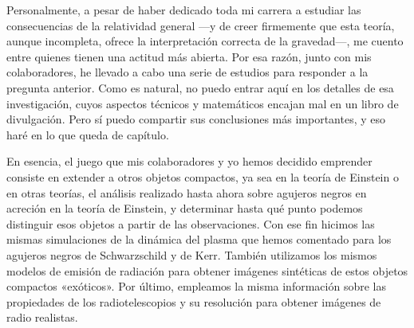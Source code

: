 Personalmente, a pesar de haber dedicado toda mi carrera a estudiar las consecuencias de la relatividad general ---y de creer firmemente que esta teoría, aunque incompleta, ofrece la interpretación correcta de la gravedad---, me cuento entre quienes tienen una actitud más abierta. Por esa razón, junto con mis colaboradores, he llevado a cabo una serie de estudios para responder a la pregunta anterior. Como es natural, no puedo entrar aquí en los detalles de esa investigación, cuyos aspectos técnicos y matemáticos encajan mal en un libro de divulgación. Pero sí puedo compartir sus conclusiones más importantes, y eso haré en lo que queda de capítulo.

En esencia, el juego que mis colaboradores y yo hemos decidido emprender consiste en extender a otros objetos compactos, ya sea en la teoría de Einstein o en otras teorías, el análisis realizado hasta ahora sobre agujeros negros en acreción en la teoría de Einstein, y determinar hasta qué punto podemos distinguir esos objetos a partir de las observaciones. Con ese fin hicimos las mismas simulaciones de la dinámica del plasma que hemos comentado para los agujeros negros de Schwarzschild y de Kerr. También utilizamos los mismos modelos de emisión de radiación para obtener imágenes sintéticas de estos objetos compactos «exóticos». Por último, empleamos la misma información sobre las propiedades de los radiotelescopios y su resolución para obtener imágenes de radio realistas.

